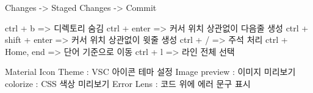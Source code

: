 Changes -> Staged Changes -> Commit

ctrl + b => 디렉토리 숨김
ctrl + enter => 커서 위치 상관없이 다음줄 생성
ctrl + shift + enter => 커서 위치 상관없이 윗줄 생성
ctrl + / => 주석 처리
ctrl + Home, end => 단어 기준으로 이동
ctrl + l => 라인 전체 선택

Material Icon Theme : VSC 아이콘 테마 설정
Image preview : 이미지 미리보기
colorize : CSS 색상 미리보기
Error Lens : 코드 위에 에러 문구 표시

